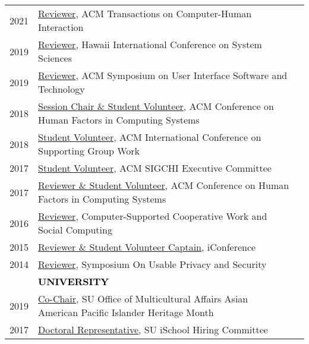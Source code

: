 \documentclass[11pt]{article}
\begin{document}
{{\begin{longtable}{Rp{0.75in}p{5.0in}}
\footnotesize{2021} & 
\href{https://dl.acm.org/journal/tochi}{Reviewer}, ACM Transactions on Computer-Human Interaction\\

\footnotesize{2019} & \href{https://hicss.hawaii.edu/}{Reviewer}, Hawaii International Conference on System Sciences\\

\footnotesize{2019} & \href{http://uist.acm.org/uist2019/}{Reviewer}, ACM Symposium on User Interface Software and Technology\\

\footnotesize{2018} & \href{https://chi2018.acm.org}{Session Chair \& Student Volunteer}, ACM Conference on Human Factors in Computing Systems\\

\footnotesize{2018} & \href{https://group.acm.org/conferences/group18/index.html}{Student Volunteer}, ACM International Conference on Supporting Group Work\\

\footnotesize{2017} & \href{https://sigchi.org/}{Student Volunteer}, ACM SIGCHI Executive Committee\\

\footnotesize{2017} & \href{https://chi2017.acm.org/}{Reviewer \& Student Volunteer}, ACM Conference on Human Factors in Computing Systems\\

\footnotesize{2016} & \href{https://cscw.acm.org/}{Reviewer}, Computer-Supported Cooperative Work and Social Computing\\

\footnotesize{2015} & \href{https://ischools.org/the-iconference/}{Reviewer \& Student Volunteer Captain}, iConference\\

\footnotesize{2014} & \href{https://www.usenix.org/sites/default/files/soups14_proceedings.pdf}{Reviewer}, Symposium On Usable Privacy and Security\\

& \textcolor{black}{\uppercase{\textbf{University}}}\\

\footnotesize{2019} & \href{http://dailyorange.com/2019/04/su-alum-deliver-lecture-industry-experience-cultural-identity-aapi-month/}{Co-Chair}, SU Office of Multicultural Affairs Asian American Pacific Islander Heritage Month\\

\footnotesize{2017} & \href{https://ischool.syr.edu/}{Doctoral Representative}, SU iSchool Hiring Committee\\


\end{longtable}}}
\end{document}
